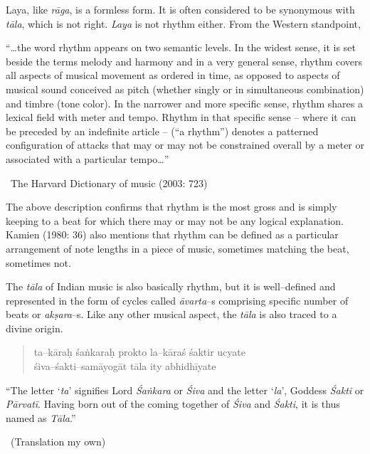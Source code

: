 Laya, like \textit{rāga}, is a formless form. It is often considered to be synonymous with \textit{tāla}, which is not right. \textit{Laya} is not rhythm either. From the Western standpoint,

\begin{myquote}
“…the word rhythm appears on two semantic levels. In the widest sense, it is set beside the terms melody and harmony and in a very general sense, rhythm covers all aspects of musical movement as ordered in time, as opposed to aspects of musical sound conceived as pitch (whether singly or in simultaneous combination) and timbre (tone color). In the narrower and more specific sense, rhythm shares a lexical field with meter and tempo. Rhythm in that specific sense – where it can be preceded by an indefinite article – (“a rhythm”) denotes a patterned configuration of attacks that may or may not be constrained overall by a meter or associated with a particular tempo…” 

~\hfill The Harvard Dictionary of music (2003: 723)
\end{myquote}

The above description confirms that rhythm is the most gross and is simply keeping to a beat for which there may or may not be any logical explanation. Kamien (1980: 36) also mentions that rhythm can be defined as a particular arrangement of note lengths in a piece of music, sometimes matching the beat, sometimes not.

The \textit{tāla} of Indian music is also basically rhythm, but it is well–defined and represented in the form of cycles called \textit{āvarta}–s comprising specific number of beats or \textit{akṣara}–s. Like any other musical aspect, the \textit{tāla} is also traced to a divine origin.

\begin{verse}
ta–kāraḥ śaṅkaraḥ prokto la–kāraś śaktir ucyate \\ śiva–śakti–samāyogāt tāla ity abhidhīyate 
\end{verse}

\begin{myquote}
“The letter ‘\textit{ta}’ signifies Lord \textit{Śaṅkara} or \textit{Śiva} and the letter ‘\textit{la}’, Goddess \textit{Śakti} or \textit{Pārvatī}. Having born out of the coming together of \textit{Śiva} and \textit{Śakti}, it is thus named as \textit{Tāla}.” 

~\hfill (Translation my own)
\end{myquote}

